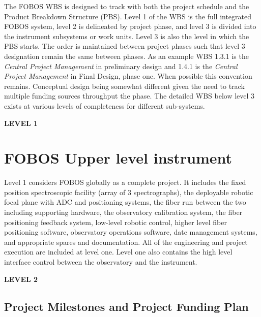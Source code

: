 \documentclass[oneside,11pt]{amsart}
\begin{document}
The FOBOS WBS is designed to track with both the project schedule and
the Product Breakdown Structure (PBS). Level 1 of the WBS is the full
integrated FOBOS system, level 2 is delineated by project phase, and
level 3 is divided into the instrument subsystems or work units.
Level 3 is also the level in which the PBS starts. The order is
maintained between project phases such that level 3 designation
remain the same between phases. As an example WBS 1.3.1 is the {\it
Central Project Management} in preliminary design and 1.4.1 is the
{\it Central Project Management} in Final Design, phase one. When
possible this convention remains. Conceptual design being somewhat
different given the need to track multiple funding sources throughput
the phase. The detailed WBS below level 3 exists at various levels of
completeness for different sub-systems.

\bigskip

\begin{center}
{\bf \Large LEVEL 1}
\end{center}

\setcounter{section}{0}
\section{FOBOS Upper level instrument}

Level 1 considers FOBOS globally as a complete project. It includes the fixed
position spectroscopic facility (array of 3 spectrographs), the deployable
robotic focal plane with ADC and positioning systems, the fiber run
between the two including supporting hardware, the observatory
calibration system, the fiber positioning feedback system, low-level
robotic control, higher level fiber positioning software, observatory
operations software, date management systems, and appropriate spares
and documentation. All of the engineering and project execution are
included at level one. Level one also contains the high level
interface control between the observatory and the instrument.

\bigskip

\begin{center}
{\bf \Large LEVEL 2}
\end{center}

\setcounter{section}{1}

\subsection{Project Milestones and Project Funding Plan}
\end{document}
